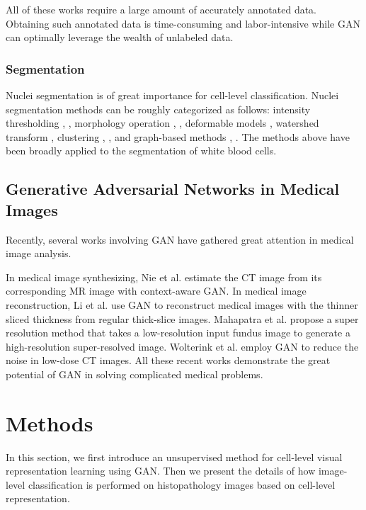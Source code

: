\documentclass[journal]{IEEEtran}
\begin{document}
All of these works require a large amount of accurately annotated data. Obtaining such annotated data is time-consuming and labor-intensive while GAN can optimally leverage the wealth of unlabeled data.

\subsubsection{Segmentation}
Nuclei segmentation is of great importance for cell-level classification. Nuclei segmentation methods can be roughly categorized as follows: intensity thresholding \cite{Callau2015Evaluation}, \cite{Wienert2012Detection}, morphology operation \cite{Dorini2013Semiautomatic}, \cite{Schmitt2009Morphological}, deformable models \cite{Dzyubachyk2010Advanced}, watershed transform \cite{Long2009A}, clustering \cite{Hai2014Automatic}, \cite{Bueno2012A}, and graph-based methods \cite{Chang2013Invariant}, \cite{Arslan2013Attributed}. The methods above have been broadly applied to the segmentation of white blood cells.

\subsection{Generative Adversarial Networks in Medical Images}
Recently, several works involving GAN have gathered great attention in medical image analysis.

In medical image synthesizing, Nie et al. \cite{nie2017medical} estimate the CT image from its corresponding MR image with context-aware GAN. In medical image reconstruction, Li et al. \cite{Li2017Reconstruction} use GAN to reconstruct medical images with the thinner sliced thickness from regular thick-slice images. Mahapatra et al. \cite{Mahapatra2017Image} propose a super resolution method that takes a low-resolution input fundus image to generate a high-resolution super-resolved image. Wolterink et al. \cite{Wolterink2017Generative} employ GAN to reduce the noise in low-dose CT images. All these recent works demonstrate the great potential of GAN in solving complicated medical problems.

\section{Methods}

In this section, we first introduce an unsupervised method for cell-level visual representation learning using GAN. Then we present the details of how image-level classification is performed on histopathology images based on cell-level representation.
\end{document}
